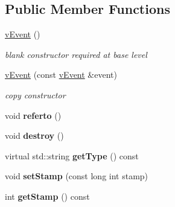 \subsection*{Public Member Functions}
\begin{DoxyCompactItemize}
\item 
\hypertarget{classemorph_1_1vEvent_ac5c3b0192528acbf4e68805e461fd734}{\hyperlink{classemorph_1_1vEvent_ac5c3b0192528acbf4e68805e461fd734}{v\-Event} ()}\label{classemorph_1_1vEvent_ac5c3b0192528acbf4e68805e461fd734}

\begin{DoxyCompactList}\small\item\em blank constructor required at base level \end{DoxyCompactList}\item 
\hypertarget{classemorph_1_1vEvent_af2f61582ba903b46ec530d8a9df49453}{\hyperlink{classemorph_1_1vEvent_af2f61582ba903b46ec530d8a9df49453}{v\-Event} (const \hyperlink{classemorph_1_1vEvent}{v\-Event} \&event)}\label{classemorph_1_1vEvent_af2f61582ba903b46ec530d8a9df49453}

\begin{DoxyCompactList}\small\item\em copy constructor \end{DoxyCompactList}\item 
\hypertarget{classemorph_1_1vEvent_a827ccbd7bf7ddd10923dfaf2aac1a0b4}{void {\bfseries referto} ()}\label{classemorph_1_1vEvent_a827ccbd7bf7ddd10923dfaf2aac1a0b4}

\item 
\hypertarget{classemorph_1_1vEvent_abda4cc0ab6fd16abd9f5da13145ab967}{void {\bfseries destroy} ()}\label{classemorph_1_1vEvent_abda4cc0ab6fd16abd9f5da13145ab967}

\item 
\hypertarget{classemorph_1_1vEvent_ae99765d28e2628d92fe4985d5a4e7951}{virtual std\-::string {\bfseries get\-Type} () const }\label{classemorph_1_1vEvent_ae99765d28e2628d92fe4985d5a4e7951}

\item 
\hypertarget{classemorph_1_1vEvent_ab17df1991d168aa8aa43eddd57dc6e04}{void {\bfseries set\-Stamp} (const long int stamp)}\label{classemorph_1_1vEvent_ab17df1991d168aa8aa43eddd57dc6e04}

\item 
\hypertarget{classemorph_1_1vEvent_a2fe87097119e68760bd4bfe9511e1c54}{int {\bfseries get\-Stamp} () const }\label{classemorph_1_1vEvent_a2fe87097119e68760bd4bfe9511e1c54}


\end{DoxyCompactItemize}
